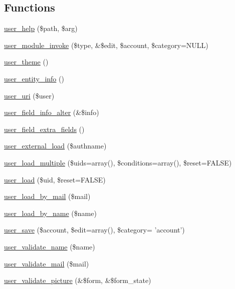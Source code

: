 \subsection*{Functions}
\begin{DoxyCompactItemize}
\item 
\hyperlink{user_8module_a7c042ca4fed4db807b9073d19269f760}{user\_\-help} (\$path, \$arg)
\item 
\hyperlink{user_8module_ab34c18f082e7d1c927b157da487c75b3}{user\_\-module\_\-invoke} (\$type, \&\$edit, \$account, \$category=NULL)
\item 
\hyperlink{user_8module_a4ca455e4035589f0235f705d376f38c7}{user\_\-theme} ()
\item 
\hyperlink{user_8module_a1dd64aa2b09d172ccab380135acb6af4}{user\_\-entity\_\-info} ()
\item 
\hyperlink{user_8module_aa9b0c1a8792930f545bda1c85a085e19}{user\_\-uri} (\$user)
\item 
\hyperlink{user_8module_ae2c0ec71e6b747b92374db56ec39a559}{user\_\-field\_\-info\_\-alter} (\&\$info)
\item 
\hyperlink{user_8module_a63f13e48d71e123e4e0a893b5dce6748}{user\_\-field\_\-extra\_\-fields} ()
\item 
\hyperlink{user_8module_a52fec3f0dbb0e33fed3d88a58453b0f4}{user\_\-external\_\-load} (\$authname)
\item 
\hyperlink{user_8module_a9f73ad4a543faed0e38e8ea170bff32e}{user\_\-load\_\-multiple} (\$uids=array(), \$conditions=array(), \$reset=FALSE)
\item 
\hyperlink{user_8module_a0f7e67c4e909ca691f57889dd5a72a07}{user\_\-load} (\$uid, \$reset=FALSE)
\item 
\hyperlink{user_8module_a68a9c7c15776d0ad6d0f7eb85e294c2d}{user\_\-load\_\-by\_\-mail} (\$mail)
\item 
\hyperlink{user_8module_a2abc1fc7de4cd56af7658688c3614f86}{user\_\-load\_\-by\_\-name} (\$name)
\item 
\hyperlink{user_8module_a857b652072abb243e0b44b02c3746a99}{user\_\-save} (\$account, \$edit=array(), \$category= 'account')
\item 
\hyperlink{user_8module_ad0830924747ece1dd3f35b0d0f4dd0f9}{user\_\-validate\_\-name} (\$name)
\item 
\hyperlink{user_8module_abe55c980b2faeab65d0a9942f99916dd}{user\_\-validate\_\-mail} (\$mail)
\item 
\hyperlink{user_8module_aa8b7bc791c72d8484dd8462440d41b3a}{user\_\-validate\_\-picture} (\&\$form, \&\$form\_\-state)

\end{DoxyCompactItemize}
